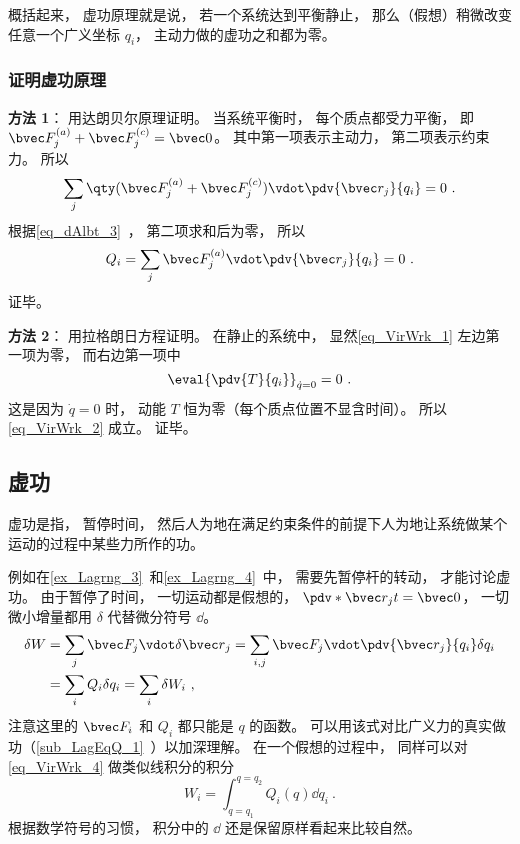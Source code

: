 概括起来， 虚功原理就是说， 若一个系统达到平衡静止， 那么（假想）稍微改变任意一个广义坐标 $q_i$， 主动力做的虚功之和都为零。

\subsubsection{证明虚功原理}
\textbf{方法 1}： 用达朗贝尔原理证明。 当系统平衡时， 每个质点都受力平衡， 即 $\bvec F_j^{(a)}+\bvec F_j^{(c)} = \bvec 0$。 其中第一项表示主动力，  第二项表示约束力。 所以
\begin{equation}
\sum_j \qty(\bvec F_j^{(a)}+\bvec F_j^{(c)}) \vdot \pdv{\bvec r_j}{q_i} = 0~.
\end{equation}
根据\autoref{eq_dAlbt_3}~， 第二项求和后为零， 所以
\begin{equation}
Q_i = \sum_j \bvec F_j^{(a)} \vdot \pdv{\bvec r_j}{q_i} = 0~.
\end{equation}
证毕。

\textbf{方法 2}： 用拉格朗日方程证明。 在静止的系统中， 显然\autoref{eq_VirWrk_1} 左边第一项为零， 而右边第一项中
\begin{equation}
\eval{\pdv{T}{q_i}}_{\dot q = 0} = 0~.
\end{equation}
这是因为 $\dot q = 0$ 时， 动能 $T$ 恒为零（每个质点位置不显含时间）。 所以\autoref{eq_VirWrk_2} 成立。 证毕。

\subsection{虚功}\label{sub_VirWrk_1}
虚功是指， 暂停时间， 然后人为地在满足约束条件的前提下人为地让系统做某个运动的过程中某些力所作的功。

例如在\autoref{ex_Lagrng_3}~和\autoref{ex_Lagrng_4}~中， 需要先暂停杆的转动， 才能讨论虚功。 由于暂停了时间， 一切运动都是假想的， $\pdv*{\bvec r_j}{t} = \bvec 0$， 一切微小增量都用 $\delta$ 代替微分符号 $\dd{}$。
\begin{equation}\label{eq_VirWrk_4}
\begin{aligned}
\delta{W} &= \sum_j \bvec F_j \vdot \delta{\bvec r}_j
= \sum_{i,j} \bvec F_j \vdot \pdv{\bvec r_j}{q_i}\delta q_i\\
&= \sum_i Q_i \delta q_i = \sum_i \delta{W_i}~,
\end{aligned}
\end{equation}
注意这里的 $\bvec F_i$ 和 $Q_i$ 都只能是 $q$ 的函数。 可以用该式对比广义力的真实做功（\autoref{sub_LagEqQ_1}~）以加深理解。 在一个假想的过程中， 同样可以对\autoref{eq_VirWrk_4} 做类似线积分的积分
\begin{equation}
W_i = \int_{q=q_1}^{q=q_2} Q_i(q) \dd q_i~.
\end{equation}
根据数学符号的习惯， 积分中的 $\dd{}$ 还是保留原样看起来比较自然。
